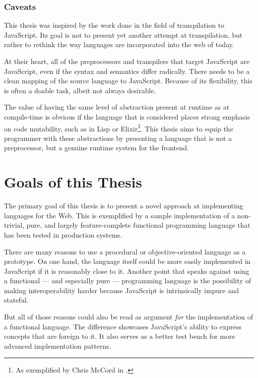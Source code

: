 \documentclass[oneside,11pt,xetex]{scrbook}
\begin{document}
\subsubsection{Caveats}

This thesis was inspired by the work done in the field of transpilation to
JavaScript. Its goal is not to present yet another attempt at transpilation,
but rather to rethink the way languages are incorporated into the web of today.

At their heart, all of the preprocessors and transpilers that target JavaScript
are JavaScript, even if the syntax and semantics differ radically. There needs
to be a clean mapping of the source language to JavaScript. Because of its flexibility,
this is often a doable task, albeit not always desirable.

The value of having the same level of abstraction present at runtime as at compile-time
is obvious if the language that is considered places strong emphasis on code
mutability, such as in Lisp or Elixir\footnote{As exemplified by Chris McCord in
\parencite{ELIX}.}. This thesis aims to equip the programmer with these abstractions
by presenting a language that is not a preprocessor, but a genuine runtime system
for the frontend.

\section{Goals of this Thesis}

The primary goal of this thesis is to present a novel approach at implementing languages
for the Web. This is exemplified by a sample implementation of a non-trivial, pure, and
largely feature-complete functional programming language that has been tested
in production systems.

There are many reasons to use a procedural or objective-oriented language as
a prototype. On one hand, the language itself could be more easily implemented in
JavaScript if it is reasonably close to it. Another point that speaks
against using a functional --- and especially pure --- programming language is the
possibility of making interoperability harder because JavaScript is intrinsically
impure and stateful.

But all of those reasons could also be read as argument \textit{for} the implementation
of a functional language. The difference showcases JavaScript's ability
to express concepts that are foreign to it. It also serves as a better
test bench for more advanced implementation patterns.
\end{document}
